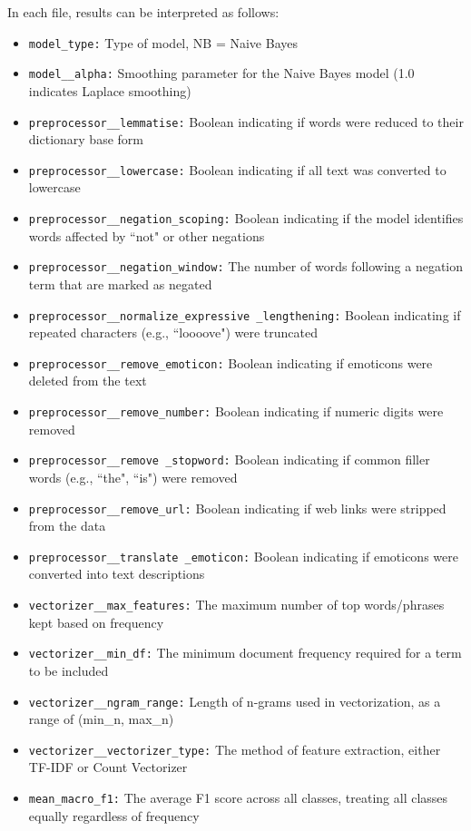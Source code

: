 \documentclass[11pt]{article}
\begin{document}
In each file, results can be interpreted as follows:

\begin{itemize}
\item \texttt{model\_type:} Type of model, NB = Naive Bayes
\item \texttt{model\_\_alpha:} Smoothing parameter for the Naive Bayes model (1.0 indicates Laplace smoothing)
\item \texttt{preprocessor\_\_lemmatise:} Boolean indicating if words were reduced to their dictionary base form
\item \texttt{preprocessor\_\_lowercase:} Boolean indicating if all text was converted to lowercase
\item \texttt{preprocessor\_\_negation\_scoping:} Boolean indicating if the model identifies words affected by ``not" or other negations
\item \texttt{preprocessor\_\_negation\_window:} The number of words following a negation term that are marked as negated
\item \texttt{preprocessor\_\_normalize\_expressive
\_lengthening:} Boolean indicating if repeated characters (e.g., ``loooove") were truncated
\item \texttt{preprocessor\_\_remove\_emoticon:} Boolean indicating if emoticons were deleted from the text
\item \texttt{preprocessor\_\_remove\_number:} Boolean indicating if numeric digits were removed
\item \texttt{preprocessor\_\_remove
\_stopword:} Boolean indicating if common filler words (e.g., ``the", ``is") were removed
\item \texttt{preprocessor\_\_remove\_url:} Boolean indicating if web links were stripped from the data
\item \texttt{preprocessor\_\_translate
\_emoticon:} Boolean indicating if emoticons were converted into text descriptions
\item \texttt{vectorizer\_\_max\_features:} The maximum number of top words/phrases kept based on frequency
\item \texttt{vectorizer\_\_min\_df:} The minimum document frequency required for a term to be included
\item \texttt{vectorizer\_\_ngram\_range:} Length of n-grams used in vectorization, as a range of (min\_n, max\_n)
\item \texttt{vectorizer\_\_vectorizer\_type:} The method of feature extraction, either TF-IDF or Count Vectorizer
\item \texttt{mean\_macro\_f1:} The average F1 score across all classes, treating all classes equally regardless of frequency
\end{itemize}
\end{document}
